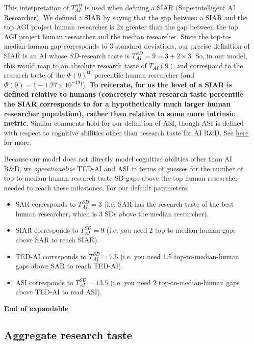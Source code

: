 \documentclass{article}
\theoremstyle{definition}
\begin{document}
This interpretation of $T_{AI}^{SD}$ is used when defining a SIAR (Superintelligent AI Researcher). We defined a SIAR by saying that the gap between a SIAR and the top AGI project human researcher is 2x greater than the gap between the top AGI project human researcher and the median researcher. Since the top-to-median-human gap corresponds to 3 standard deviations, our precise definition of SIAR is an AI whose $SD$-research taste is $T_{AI}^{SD} = 9 = 3 + 2 \times 3$. So, in our model, this would map to an absolute research taste of $T_{AI}(9)$ and correspond to the research taste of the $\Phi(9)^{\text{th}}$ percentile human researcher (and $\Phi(9) = 1-1.27 \times 10^{-19}$!). \textbf{To reiterate, for us the level of a SIAR is defined relative to humans (concretely what research taste percentile the SIAR corresponds to for a hypothetically much larger human researcher population), rather than relative to some more intrinsic metric.} Similar comments hold for our definition of ASI, though ASI is defined with respect to cognitive abilities other than research taste for AI R\&D. See \href{https://docs.google.com/document/d/1ru6Okbxb6XuH18Cz8439sdQJazMV39hNxsWDokh97r0/edit?tab=t.0#bookmark=kix.dqb22jmo2tq3}{here} for more. 

Because our model does not directly model cognitive abilities other than AI R\&D, we \textit{operationalize} TED-AI and ASI in terms of guesses for the number of top-to-median-human research taste SD-gaps above the top human researcher needed to reach these milestones. For our default parameters:
\begin{itemize}
\item SAR corresponds to $T_{AI}^{SD} = 3$ (i.e. SAR has the research taste of the best human researcher, which is 3 SDs above the median researcher).
\item SIAR corresponds to $T_{AI}^{SD} = 9$ (i.e. you need 2 top-to-median-human gaps above SAR to reach SIAR).
\item TED-AI corresponds to $T_{AI}^{SD} = 7.5$ (i.e. you need 1.5 top-to-median-human gaps above SAR to reach TED-AI).
\item ASI corresponds to $T_{AI}^{SD} = 13.5$ (i.e. you need 2 top-to-median-human gaps above TED-AI to read ASI).
\end{itemize}
\textbf{End of expandable}


\subsection{Aggregate research taste} \label{Aggregate research taste}
\end{document}
